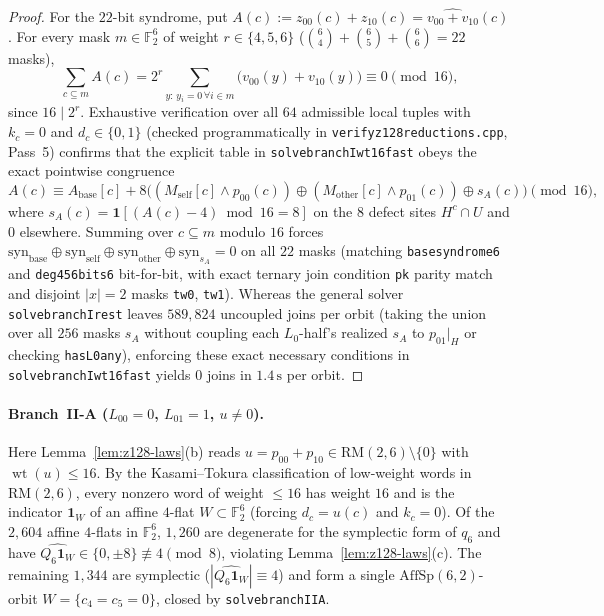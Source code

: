 \documentclass[11pt]{article}
\theoremstyle{definition}
\theoremstyle{remark}
\newcommand{\F}{\mathbb{F}}
\newcommand{\wt}{\operatorname{wt}}
\newcommand{\ind}{\mathbf{1}}
\newcommand{\RM}{\mathrm{RM}}
\newcommand{\code}[1]{\texttt{#1}}
\DeclareRobustCommand{\_}{\textunderscore\allowbreak}
\begin{document}
\begin{proof}
For the $22$-bit syndrome, put $A(c):=z_{00}(c)+z_{10}(c)=\widehat{v_{00}+v_{10}}(c)$. For every mask $m\in\F_2^6$ of weight $r\in\{4,5,6\}$ ($\binom64+\binom65+\binom66=22$ masks),
\[
  \sum_{c\subseteq m}A(c)=2^r\sum_{y:\,y_i=0\,\forall i\in m}\big(v_{00}(y)+v_{10}(y)\big)\equiv0\pmod{16},
\]
since $16\mid 2^r$. Exhaustive verification over all $64$ admissible local tuples with $k_c=0$ and $d_c\in\{0,1\}$ (checked programmatically in \code{verify\_z128\_reductions.cpp}, Pass~5) confirms that the explicit table in \code{solve\_branchI\_wt16\_fast} obeys the exact pointwise congruence
\[
  A(c)\equiv A_{\mathrm{base}}[c]+8\Big((M_{\mathrm{self}}[c]\wedge p_{00}(c))\oplus(M_{\mathrm{other}}[c]\wedge p_{01}(c))\oplus s_A(c)\Big)\pmod{16},
\]
where $s_A(c)=\ind[(A(c)-4)\bmod16=8]$ on the $8$ defect sites $H^c\cap U$ and $0$ elsewhere. Summing over $c\subseteq m$ modulo $16$ forces $\mathrm{syn}_{\mathrm{base}}\oplus\mathrm{syn}_{\mathrm{self}}\oplus\mathrm{syn}_{\mathrm{other}}\oplus\mathrm{syn}_{s_A}=0$ on all $22$ masks (matching \code{base\_syndrome6} and \code{deg456\_bits6} bit-for-bit, with exact ternary join condition \code{pk} parity match and disjoint $|x|=2$ masks \code{tw0}, \code{tw1}). Whereas the general solver \code{solve\_branchI\_rest} leaves $589{,}824$ uncoupled joins per orbit (taking the union over all $256$ masks $s_A$ without coupling each $L_0$-half's realized $s_A$ to $p_{01}|_H$ or checking \code{has\_L0\_any}), enforcing these exact necessary conditions in \code{solve\_branchI\_wt16\_fast} yields $0$ joins in $1.4\,\mathrm{s}$ per orbit.
\end{proof}

\paragraph{Branch~II-A ($L_{00}=0$, $L_{01}=1$, $u\neq0$).}
Here Lemma~\ref{lem:z128-laws}(b) reads $u=p_{00}+p_{10}\in\RM(2,6)\setminus\{0\}$ with $\wt(u)\le16$. By the Kasami--Tokura classification of low-weight words in $\RM(2,6)$, every nonzero word of weight $\le16$ has weight $16$ and is the indicator $\ind_W$ of an affine $4$-flat $W\subset\F_2^6$ (forcing $d_c=u(c)$ and $k_c=0$). Of the $2{,}604$ affine $4$-flats in $\F_2^6$, $1{,}260$ are degenerate for the symplectic form of $q_6$ and have $\widehat{Q_6\ind_W}\in\{0,\pm8\}\not\equiv4\pmod 8$, violating Lemma~\ref{lem:z128-laws}(c). The remaining $1{,}344$ are symplectic ($|\widehat{Q_6\ind_W}|\equiv4$) and form a single $\mathrm{AffSp}(6,2)$-orbit $W=\{c_4=c_5=0\}$, closed by \code{solve\_branchIIA}.
\end{document}
